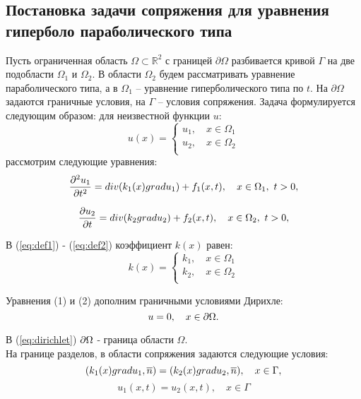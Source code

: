 \subsection{Постановка задачи сопряжения для уравнения гиперболо параболического типа}
Пусть ограниченная область $\Omega \subset  \mathbb{R}^2 $ с границей $\partial \Omega$ разбивается кривой 
$\Gamma$ на две подобласти $\Omega_1$ и $\Omega_2$. В области $\Omega_2$ будем рассматривать уравнение параболического типа,
 а в $\Omega_1$ -- уравнение гиперболического типа по $t$. На $\partial \Omega$ задаются граничные условия, на $\Gamma$ -- условия сопряжения. Задача формулируется следующим образом: для неизвестной функции $u$:
$$
u(x) =
  \begin{cases}
    u_1, \quad x \in \Omega_1\\
    u_2, \quad x \in \Omega_2 \\
  \end{cases}
$$
рассмотрим следующие уравнения:
\begin{equation}
    {\frac{\partial^2 u_1}{\partial t^2}} = div(k_1(x)gradu_1) + f_1(x, t), \quad x \in \Omega_1,~t > 0,
    \label{eq:def1}
\end{equation}

\begin{equation}
    {\frac{\partial u_2}{\partial t}} = div(k_2gradu_2) + f_2(x, t), \quad x \in \Omega_2,~t>0,
    \label{eq:def2}
\end{equation}

В (\ref{eq:def1}) - (\ref{eq:def2}) коэффициент $k(x)$ равен:
$$
k(x) =
  \begin{cases}
    k_1, \quad x \in \Omega_1\\
    k_2, \quad x \in \Omega_2 \\
  \end{cases}
$$

Уравнения (1) и (2) дополним граничными условиями Дирихле:
\begin{equation}
     u = 0, \quad x \in {\partial \Omega}.
    \label{eq:dirichlet}
\end{equation}

В (\ref{eq:dirichlet}) ${\partial \Omega}$ - граница области $\Omega$. \\

На границе разделов, в области сопряжения задаются следующие условия:
\begin{equation}
    (k_1(x)gradu_1, \overline{n}) = (k_2(x)gradu_2, \overline{n}), \quad x \in \Gamma ,
    \label{eq:conjugation}
\end{equation}
$$ u_1(x,t) = u_2(x, t), \quad x \in \Gamma$$

